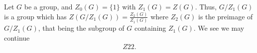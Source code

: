 Let \(G\) be a group, and \(Z_0 \left( G \right)  = \{1\} \) with \(Z_1 \left( G \right)  = Z\left( G \right) \). Thus, \( G / Z_1\left( G \right) \) is a group which has \(Z\left( G / Z_1\left( G \right)  \right)  = \frac{Z_2 \left( G \right) }{Z_1 \left( G \right) }\) where \(Z_2\left( G \right) \) is the preimage of \( G  / Z_1\left( G \right) \), that being the subgroup of \(G\) containing \(Z_1 \left( G \right) \). We see we may continue
\begin{align*}
	Z22
.\end{align*}

